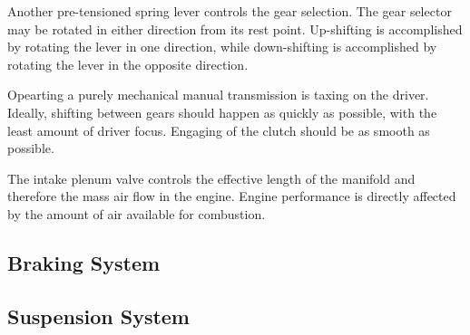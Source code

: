 Another pre-tensioned spring lever controls the gear selection. The gear selector may be rotated in 
either direction from its rest point. Up-shifting is accomplished by rotating the lever in one 
direction, while down-shifting is accomplished by rotating the lever in the opposite direction. 

Opearting a purely mechanical manual transmission is taxing on the driver. Ideally, shifting
between gears should happen as quickly as possible, with the least amount of driver focus. 
Engaging of the clutch should be as smooth as possible. 

The intake plenum valve controls the effective length of the manifold and therefore the mass air
flow in the engine. Engine performance is directly affected by the amount of air available for
combustion. 

\subsection{Braking System}

\subsection{Suspension System}
